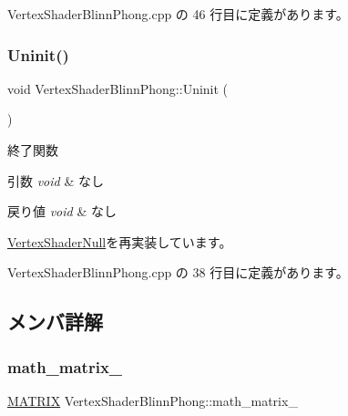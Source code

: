 Vertex\+Shader\+Blinn\+Phong.\+cpp の 46 行目に定義があります。

\mbox{\label{class_vertex_shader_blinn_phong_a26af54fcf9adccbe449a65d7a078c02f}} 
\subsubsection{\texorpdfstring{Uninit()}{Uninit()}}
{\footnotesize\ttfamily void Vertex\+Shader\+Blinn\+Phong\+::\+Uninit (\begin{DoxyParamCaption}{ }\end{DoxyParamCaption})\hspace{0.3cm}{\ttfamily [virtual]}}



終了関数 


\begin{DoxyParams}{引数}
{\em void} & なし \\
\hline
\end{DoxyParams}

\begin{DoxyRetVals}{戻り値}
{\em void} & なし \\
\hline
\end{DoxyRetVals}


\mbox{\hyperlink{class_vertex_shader_null_adf758f295d2803c6d8bd7e05e461abec}{Vertex\+Shader\+Null}}を再実装しています。



 Vertex\+Shader\+Blinn\+Phong.\+cpp の 38 行目に定義があります。



\subsection{メンバ詳解}
\mbox{\label{class_vertex_shader_blinn_phong_ad9e0207ddf6d0b2452d8dfdf3ee1ccbd}} 
\subsubsection{\texorpdfstring{math\+\_\+matrix\+\_\+}{math\_matrix\_}}
{\footnotesize\ttfamily \mbox{\hyperlink{_matrix_8h_a032295cd9fb1b711757c90667278e744}{M\+A\+T\+R\+IX}} Vertex\+Shader\+Blinn\+Phong\+::math\+\_\+matrix\+\_\+\hspace{0.3cm}{\ttfamily [private]}}



